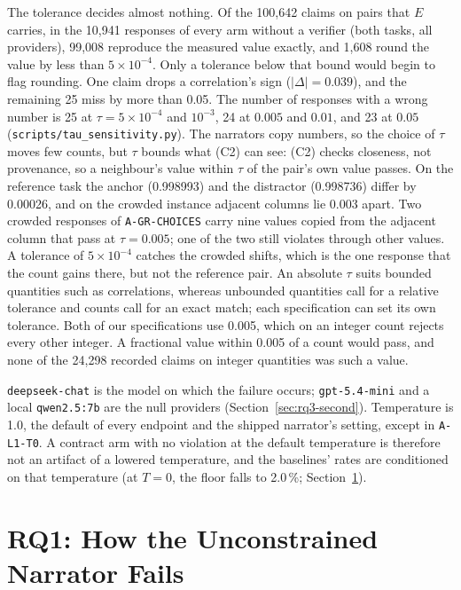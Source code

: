\documentclass[journal]{IEEEtran}
\begin{document}
The tolerance decides almost nothing. Of the 100{,}642 claims on pairs that
$E$ carries, in the 10{,}941 responses of every arm without a verifier (both
tasks, all providers), 99{,}008 reproduce the measured value exactly, and
1{,}608 round the value by less than $5\times10^{-4}$. Only a tolerance below
that bound would begin to flag rounding. One claim drops a correlation's sign
($|\Delta| = 0.039$), and the remaining 25 miss by more than 0.05. The number
of responses with a wrong number is 25 at $\tau=5\times10^{-4}$ and
$10^{-3}$, 24 at $0.005$ and $0.01$, and 23 at $0.05$
(\texttt{scripts/tau\_sensitivity.py}). The narrators copy numbers, so the
choice of $\tau$ moves few counts, but $\tau$ bounds what (C2) can see: (C2)
checks closeness, not provenance, so a neighbour's value within $\tau$ of the
pair's own value passes. On the reference task the anchor (0.998993) and the distractor (0.998736)
differ by 0.00026, and on the crowded instance adjacent columns lie 0.003 apart.
Two crowded responses of \texttt{A-GR-CHOICES} carry nine values copied from the
adjacent column that pass at $\tau=0.005$; one of the two still violates through
other values. A tolerance of $5\times10^{-4}$ catches the crowded shifts, which
is the one response that the count gains there, but not the reference pair. An
absolute $\tau$ suits bounded quantities such as correlations, whereas
unbounded quantities call for a relative tolerance and counts call for an exact
match; each specification can set its own tolerance. Both of our
specifications use 0.005, which on an integer count rejects every other
integer. A fractional value within 0.005 of a count would pass, and none of the
24{,}298 recorded claims on integer quantities was such a value.

\texttt{deepseek-chat} is the model on which the failure occurs;
\texttt{gpt-5.4-mini} and a local \texttt{qwen2.5:7b} are the null providers
(Section~\ref{sec:rq3-second}). Temperature is 1.0, the default of every
endpoint and the shipped narrator's setting, except in \texttt{A-L1-T0}. A
contract arm with no violation at the default temperature is therefore not an
artifact of a lowered temperature, and the baselines' rates are conditioned on
that temperature (at $T=0$, the floor falls to 2.0\,\%;
Section~\ref{sec:rq1}).

\section{RQ1: How the Unconstrained Narrator Fails}\label{sec:rq1}
\end{document}
